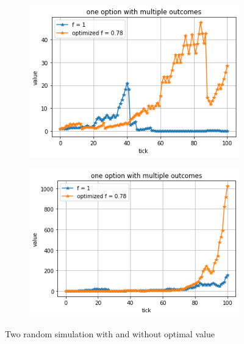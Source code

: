 \documentclass{article}
\begin{document}
	\begin{figure}[h]
		\begin{subfigure}{0.525\textwidth}
			\includegraphics[width=0.9\linewidth]{single1} 
			\label{fig:subim1}
		\end{subfigure}
		\begin{subfigure}{0.525\textwidth}
			\includegraphics[width=0.9\linewidth]{single2}
			\label{fig:subim2}
		\end{subfigure}
		\caption{Two random simulation with and without optimal value}
		\label{Fig:single1}
	\end{figure}	
	
\end{document}
